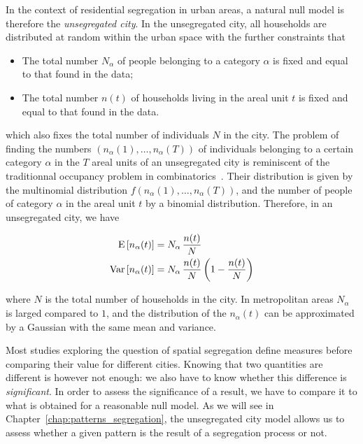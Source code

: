 In the context of residential segregation in urban areas, a natural null model
is therefore the \emph{unsegregated city}. In the unsegregated city, all
households are distributed at random within the urban space with the further
constraints that

\begin{itemize}
    \item The total number $N_\alpha$ of people belonging to a category
	    $\alpha$ is fixed and equal to that found in the data;
    \item The total number $n(t)$ of households living in the areal unit $t$ is
	    fixed and equal to that found in the data.
\end{itemize}

which also fixes the total number of individuals $N$ in the city. The problem of
finding the numbers $\left( n_\alpha(1), \dots, n_\alpha(T) \right)$ of
individuals belonging to a certain category $\alpha$ in the $T$ areal units of
an unsegregated city is reminiscent of the traditionnal occupancy problem in
combinatorics~\cite{Feller:1950}. Their distribution is given by the multinomial
distribution $f \left( n_\alpha(1), \dots, n_\alpha(T) \right)$, and the number
of people of category $\alpha$ in the areal unit $t$ by a binomial distribution.
Therefore, in an unsegregated city, we have

\begin{align}
    \begin{split}
	\mathrm{E} \left[ n_\alpha(t) \right] &= N_\alpha\,\frac{n(t)}{N} \\
	\mathrm{Var} \left[ n_\alpha(t) \right] &= N_\alpha\,\frac{n(t)}{N} \left( 1 - \frac{n(t)}{N}  \right) 
    \end{split}
\end{align}

where $N$ is the total number of households in the city. In metropolitan areas
$N_\alpha$ is larged compared to $1$, and the distribution of the $n_\alpha(t)$
can be approximated by a Gaussian with the same mean and variance.


Most studies exploring the question of spatial segregation define measures
before comparing their value for different cities. Knowing that two quantities
are different is however not enough: we also have to know whether this
difference is {\em significant}. In order to assess the significance of a
result, we have to compare it to what is obtained for a reasonable null model.
As we will see in Chapter~\ref{chap:patterns_segregation}, the 
unsegregated city model allows us to assess whether a given pattern is
the result of a segregation process or not.\\

